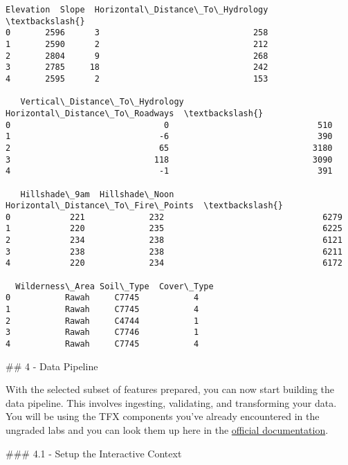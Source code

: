 \documentclass[11pt]{article}
\makeatletter
\newcommand{\boxspacing}{\kern\kvtcb@left@rule\kern\kvtcb@boxsep}
\newcommand{\prompt}[4]{
        {\ttfamily\llap{{\color{#2}[#3]:\hspace{3pt}#4}}\vspace{-\baselineskip}}
    }
\makeatother
\begin{document}
            \begin{tcolorbox}[breakable, size=fbox, boxrule=.5pt, pad at break*=1mm, opacityfill=0]
\prompt{Out}{outcolor}{12}{\boxspacing}
\begin{Verbatim}[commandchars=\\\{\}]
   Elevation  Slope  Horizontal\_Distance\_To\_Hydrology  \textbackslash{}
0       2596      3                               258
1       2590      2                               212
2       2804      9                               268
3       2785     18                               242
4       2595      2                               153

   Vertical\_Distance\_To\_Hydrology  Horizontal\_Distance\_To\_Roadways  \textbackslash{}
0                               0                              510
1                              -6                              390
2                              65                             3180
3                             118                             3090
4                              -1                              391

   Hillshade\_9am  Hillshade\_Noon  Horizontal\_Distance\_To\_Fire\_Points  \textbackslash{}
0            221             232                                6279
1            220             235                                6225
2            234             238                                6121
3            238             238                                6211
4            220             234                                6172

  Wilderness\_Area Soil\_Type  Cover\_Type
0           Rawah     C7745           4
1           Rawah     C7745           4
2           Rawah     C4744           1
3           Rawah     C7746           1
4           Rawah     C7745           4
\end{Verbatim}
\end{tcolorbox}
        
    \#\# 4 - Data Pipeline

With the selected subset of features prepared, you can now start
building the data pipeline. This involves ingesting, validating, and
transforming your data. You will be using the TFX components you've
already encountered in the ungraded labs and you can look them up here
in the
\href{https://www.tensorflow.org/tfx/api_docs/python/tfx/components}{official
documentation}.

    \#\#\# 4.1 - Setup the Interactive Context
\end{document}
